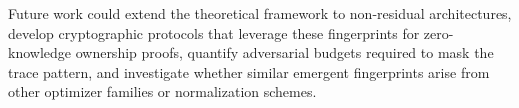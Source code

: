 \documentclass[wcp]{jmlr}
\begin{document}
Future work could extend the theoretical framework to non-residual architectures, develop cryptographic protocols that leverage these fingerprints for zero-knowledge ownership proofs, quantify adversarial budgets required to mask the trace pattern, and investigate whether similar emergent fingerprints arise from other optimizer families or normalization schemes.



\end{document}
